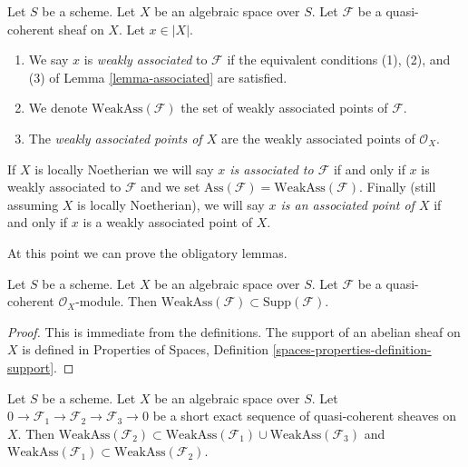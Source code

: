 \begin{definition}
\label{definition-weakly-associated}
Let $S$ be a scheme. Let $X$ be an algebraic space over $S$.
Let $\mathcal{F}$ be a quasi-coherent sheaf on $X$.
Let $x \in |X|$.
\begin{enumerate}
\item We say $x$ is {\it weakly associated} to $\mathcal{F}$
if the equivalent conditions (1), (2), and (3) of
Lemma \ref{lemma-associated} are satisfied.
\item We denote $\text{WeakAss}(\mathcal{F})$ the set of weakly associated
points of $\mathcal{F}$.
\item The {\it weakly associated points of $X$} are the weakly associated
points of $\mathcal{O}_X$.
\end{enumerate}
If $X$ is locally Noetherian we will say
{\it $x$ is associated to $\mathcal{F}$}
if and only if $x$ is weakly associated to $\mathcal{F}$ and we set
$\text{Ass}(\mathcal{F}) = \text{WeakAss}(\mathcal{F})$.
Finally (still assuming $X$ is locally Noetherian),
we will say {\it $x$ is an associated point of $X$} if and only if
$x$ is a weakly associated point of $X$.
\end{definition}

\noindent
At this point we can prove the obligatory lemmas.

\begin{lemma}
\label{lemma-weakly-ass-support}
Let $S$ be a scheme. Let $X$ be an algebraic space over $S$.
Let $\mathcal{F}$ be a quasi-coherent $\mathcal{O}_X$-module.
Then $\text{WeakAss}(\mathcal{F}) \subset \text{Supp}(\mathcal{F})$.
\end{lemma}

\begin{proof}
This is immediate from the definitions. The support of an abelian sheaf
on $X$ is defined in Properties of Spaces, Definition
\ref{spaces-properties-definition-support}.
\end{proof}

\begin{lemma}
\label{lemma-ses-weakly-ass}
Let $S$ be a scheme. Let $X$ be an algebraic space over $S$.
Let $0 \to \mathcal{F}_1 \to \mathcal{F}_2 \to \mathcal{F}_3 \to 0$
be a short exact sequence of quasi-coherent sheaves on $X$.
Then
$\text{WeakAss}(\mathcal{F}_2) \subset
\text{WeakAss}(\mathcal{F}_1) \cup \text{WeakAss}(\mathcal{F}_3)$
and
$\text{WeakAss}(\mathcal{F}_1) \subset \text{WeakAss}(\mathcal{F}_2)$.
\end{lemma}

